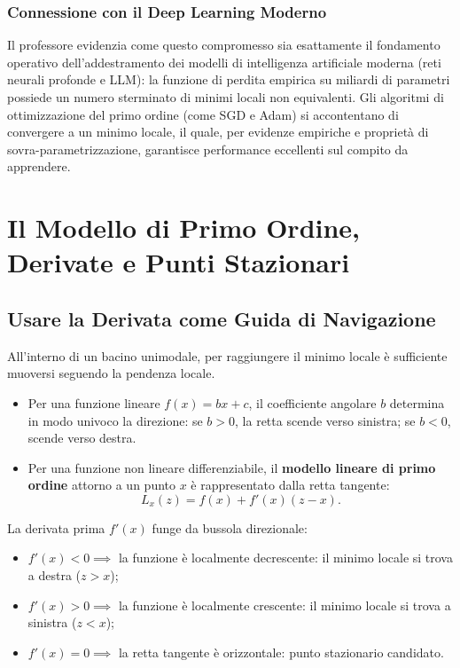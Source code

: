 \subsubsection{Connessione con il Deep Learning Moderno}
Il professore evidenzia come questo compromesso sia esattamente il fondamento operativo dell'addestramento dei modelli di intelligenza artificiale moderna (reti neurali profonde e LLM): la funzione di perdita empirica su miliardi di parametri possiede un numero sterminato di minimi locali non equivalenti. Gli algoritmi di ottimizzazione del primo ordine (come SGD e Adam) si accontentano di convergere a un minimo locale, il quale, per evidenze empiriche e propriet\`a di sovra-parametrizzazione, garantisce performance eccellenti sul compito da apprendere.

\FloatBarrier
\section{Il Modello di Primo Ordine, Derivate e Punti Stazionari}
\label{sec:univariata-modello-primo-ordine-derivate}

\subsection{Usare la Derivata come Guida di Navigazione}
All'interno di un bacino unimodale, per raggiungere il minimo locale \`e sufficiente muoversi seguendo la pendenza locale.
\begin{itemize}
    \item Per una funzione lineare $f(x) = bx + c$, il coefficiente angolare $b$ determina in modo univoco la direzione: se $b > 0$, la retta scende verso sinistra; se $b < 0$, scende verso destra.
    \item Per una funzione non lineare differenziabile, il \textbf{modello lineare di primo ordine} attorno a un punto $x$ \`e rappresentato dalla retta tangente:
    \begin{equation}
        L_x(z) = f(x) + f'(x)(z - x).
    \end{equation}
\end{itemize}
La derivata prima $f'(x)$ funge da bussola direzionale:
\begin{itemize}
    \item $f'(x) < 0 \implies$ la funzione \`e localmente decrescente: il minimo locale si trova a destra ($z > x$);
    \item $f'(x) > 0 \implies$ la funzione \`e localmente crescente: il minimo locale si trova a sinistra ($z < x$);
    \item $f'(x) = 0 \implies$ la retta tangente \`e orizzontale: punto stazionario candidato.
\end{itemize}


